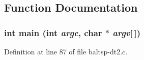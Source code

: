 \subsection{Function Documentation}
\hypertarget{bin_2baltsp-dt2_8c_0ddf1224851353fc92bfbff6f499fa97}{
\subsubsection[{main}]{\setlength{\rightskip}{0pt plus 5cm}int main (int {\em argc}, \/  char $\ast$ {\em argv}\mbox{[}$\,$\mbox{]})}}
\label{bin_2baltsp-dt2_8c_0ddf1224851353fc92bfbff6f499fa97}




Definition at line 87 of file baltsp-dt2.c.

